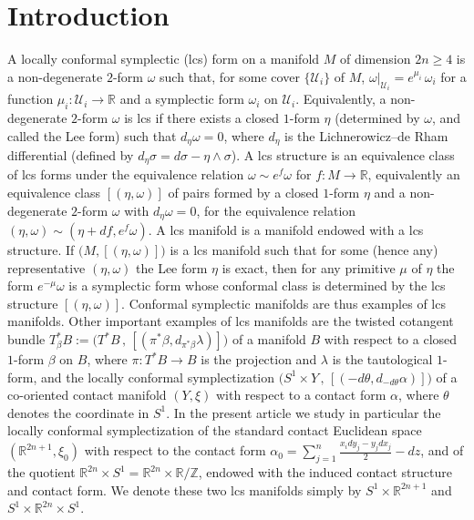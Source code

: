 \documentclass{amsart}
\theoremstyle{remark}
\begin{document}
\section{Introduction}


A locally conformal symplectic (lcs) form
on a manifold $M$ of dimension $2n \geq 4$
is a non-degenerate $2$-form $\omega$ such that,
for some cover $\{\mathcal{U}_i\}$ of $M$,
$\left. \omega \right\lvert_{\mathcal{U}_i} = e^{\mu_i} \, \omega_i$
for a function $\mu_i: \mathcal{U}_i \rightarrow \mathbb{R}$
and a symplectic form $\omega_i$ on $\mathcal{U}_i$.
Equivalently,
a non-degenerate $2$-form $\omega$ is lcs
if there exists a closed $1$-form $\eta$
(determined by $\omega$, and called the Lee form)
such that $d_{\eta}\omega = 0$,
where $d_{\eta}$ is the Lichnerowicz--de Rham differential
(defined by $d_{\eta}\sigma = d\sigma - \eta \wedge \sigma$).
A lcs structure is an equivalence class of lcs forms
under the equivalence relation
$\omega \sim e^f \omega$ for $f: M \rightarrow \mathbb{R}$,
equivalently an equivalence class $[(\eta, \omega)]$
of pairs formed by a closed $1$-form $\eta$
and a non-degenerate $2$-form $\omega$ with $d_{\eta}\omega=0$,
for the equivalence relation $(\eta, \omega) \sim (\eta + df, e^f \omega)$. A lcs manifold is a manifold endowed with a lcs structure.
If $\big( M , [(\eta, \omega)] \big)$ is a lcs manifold
such that for some (hence any) representative $(\eta, \omega)$
the Lee form $\eta$ is exact,
then for any primitive $\mu$ of $\eta$
the form $e^{-\mu} \omega$ is a symplectic form
whose conformal class is determined
by the lcs structure $[(\eta, \omega)]$.
Conformal symplectic manifolds are thus examples of lcs manifolds.
Other important examples of lcs manifolds
are the twisted cotangent bundle
$T_{\beta}^{\ast}B := \big( T^{\ast}B \,,\,  [(\pi^{\ast}\beta, d_{\pi^{\ast}\beta}\lambda)] \big)$
of a manifold $B$ with respect to a closed $1$-form $\beta$ on $B$,
where $\pi: T^{\ast}B \rightarrow B$ is the projection
and $\lambda$ is the tautological $1$-form,
and the locally conformal symplectization
$\big( S^1 \times Y \,,\, [(-d\theta, d_{-d\theta}\alpha)] \big)$
of a co-oriented contact manifold $(Y, \xi)$
with respect to a contact form $\alpha$,
where $\theta$ denotes the coordinate in $S^1$.
In the present article we study in particular
the locally conformal symplectization
of the standard contact Euclidean space $(\mathbb{R}^{2n+1}, \xi_0)$
with respect to the contact form
$\alpha_0 = \sum_{j=1}^n \frac{x_idy_j - y_jdx_j}{2} - dz$,
and of the quotient
$\mathbb{R}^{2n} \times S^1 = \mathbb{R}^{2n} \times \mathbb{R}/\mathbb{Z}$,
endowed with the induced contact structure and contact form.
We denote these two lcs manifolds simply by
$S^1 \times \mathbb{R}^{2n+1}$
and $S^1 \times \mathbb{R}^{2n} \times S^1$.
\end{document}
